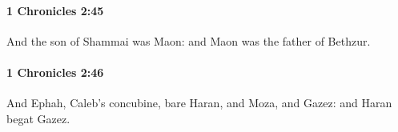 		\paragraph{1 Chronicles 2:45} %
			\label{1CHRONICLES-2-45}

			And the son of Shammai was Maon: and Maon was the father of Bethzur.


		\paragraph{1 Chronicles 2:46} %
			\label{1CHRONICLES-2-46}

			And Ephah, Caleb’s concubine, bare Haran, and Moza, and Gazez: and Haran begat Gazez.


